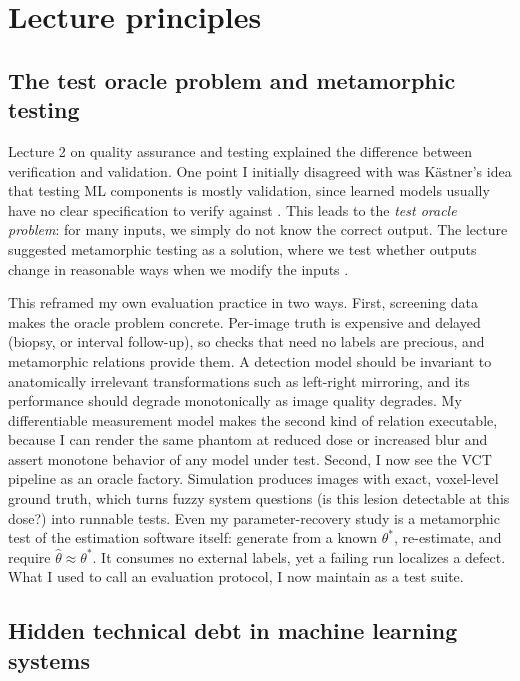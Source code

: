 \documentclass[11pt,a4paper]{article}
\begin{document}
\section{Lecture principles}

\subsection{The test oracle problem and metamorphic testing}

Lecture 2 on quality assurance and testing explained the difference between verification and validation. One point I initially disagreed with was K\"astner's idea that testing ML components is mostly validation, since learned models usually have no clear specification to verify against \cite{kastner}. This leads to the \emph{test oracle problem}: for many inputs, we simply do not know the correct output. The lecture suggested metamorphic testing as a solution, where we test whether outputs change in reasonable ways when we modify the inputs \cite{coursedecks}.
\newpage

This reframed my own evaluation practice in two ways. First, screening data makes the oracle problem concrete. Per-image truth is expensive and delayed (biopsy, or interval follow-up), so checks that need no labels are precious, and metamorphic relations provide them. A detection model should be invariant to anatomically irrelevant transformations such as left-right mirroring, and its performance should degrade monotonically as image quality degrades. My differentiable measurement model makes the second kind of relation executable, because I can render the same phantom at reduced dose or increased blur and assert monotone behavior of any model under test. Second, I now see the VCT pipeline as an oracle factory. Simulation produces images with exact, voxel-level ground truth, which turns fuzzy system questions (is this lesion detectable at this dose?) into runnable tests. Even my parameter-recovery study is a metamorphic test of the estimation software itself: generate from a known $\theta^{*}$, re-estimate, and require $\hat{\theta}\approx\theta^{*}$. It consumes no external labels, yet a failing run localizes a defect. What I used to call an evaluation protocol, I now maintain as a test suite.

\subsection{Hidden technical debt in machine learning systems}
\end{document}
